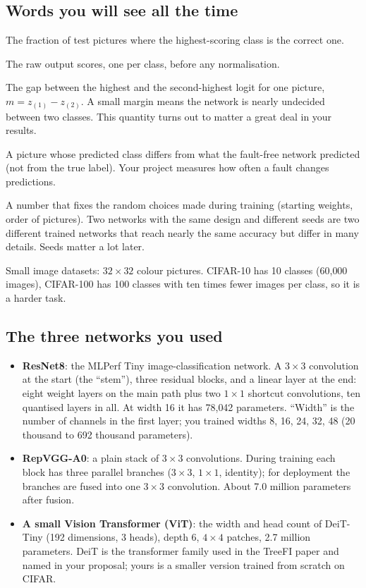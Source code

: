 \subsection{Words you will see all the time}
\begin{description}[leftmargin=2.2cm,style=nextline]
\item[Top-1 accuracy] The fraction of test pictures where the highest-scoring class is the correct one.
\item[Logits] The raw output scores, one per class, before any normalisation.
\item[Margin] The gap between the highest and the second-highest logit for one picture,
 $m = z_{(1)} - z_{(2)}$. A small margin means the network is nearly undecided between two classes.
 This quantity turns out to matter a great deal in your results.
\item[Prediction changed] A picture whose predicted class differs from what the fault-free network predicted
 (not from the true label). Your project measures how often a fault changes predictions.
\item[Seed] A number that fixes the random choices made during training (starting weights, order of
 pictures). Two networks with the same design and different seeds are two different trained networks that
 reach nearly the same accuracy but differ in many details. Seeds matter a lot later.
\item[CIFAR-10 / CIFAR-100] Small image datasets: $32\times32$ colour pictures. CIFAR-10 has 10 classes
 (60{,}000 images), CIFAR-100 has 100 classes with ten times fewer images per class, so it is a harder task.
\end{description}

\subsection{The three networks you used}
\begin{itemize}
\item \textbf{ResNet8}: the MLPerf Tiny image-classification network. A $3\times3$ convolution at the start
 (the ``stem''), three residual blocks, and a linear layer at the end: eight weight layers on the main path
 plus two $1\times1$ shortcut convolutions, ten quantised layers in all. At width 16 it has 78{,}042
 parameters. ``Width'' is the number of channels in the first layer; you trained widths 8, 16, 24, 32, 48
 (20 thousand to 692 thousand parameters).
\item \textbf{RepVGG-A0}: a plain stack of $3\times3$ convolutions. During training each block has three
 parallel branches ($3\times3$, $1\times1$, identity); for deployment the branches are fused into one
 $3\times3$ convolution. About 7.0 million parameters after fusion.
\item \textbf{A small Vision Transformer (ViT)}: the width and head count of DeiT-Tiny (192 dimensions,
 3 heads), depth 6, $4\times4$ patches, 2.7 million parameters. DeiT is the transformer family used in
 the TreeFI paper and named in your proposal; yours is a smaller version trained from scratch on CIFAR.
\end{itemize}

